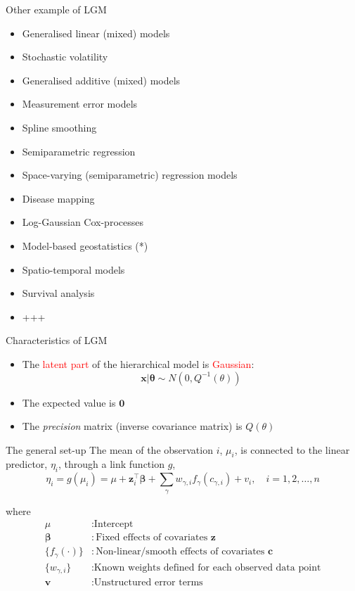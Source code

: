 \documentclass[
  ignorenonframetext,
]{beamer}
\providecommand{\tightlist}{%
  \setlength{\itemsep}{0pt}\setlength{\parskip}{0pt}}
\begin{document}
\begin{frame}{Other example of LGM}
\protect\hypertarget{other-example-of-lgm}{}
\begin{itemize}
\tightlist
\item
  Generalised linear (mixed) models
\item
  Stochastic volatility
\item
  Generalised additive (mixed) models
\item
  Measurement error models
\item
  Spline smoothing
\item
  Semiparametric regression
\item
  Space-varying (semiparametric) regression models
\item
  Disease mapping
\item
  Log-Gaussian Cox-processes
\item
  Model-based geostatistics (*)
\item
  Spatio-temporal models
\item
  Survival analysis
\item
  +++
\end{itemize}
\end{frame}

\begin{frame}{Characteristics of LGM}
\protect\hypertarget{characteristics-of-lgm}{}
\begin{itemize}
\item
  The \textcolor{red}{latent part} of the hierarchical model is
  \textcolor{red}{Gaussian}: \[
  \boldsymbol{x} | \boldsymbol{\theta} \sim N(0, {Q}^{-1}(\theta))
  \]
\item
  The expected value is \(\boldsymbol{0}\)
\item
  The \emph{precision} matrix (inverse covariance matrix) is
  \({Q}(\theta)\)
\end{itemize}
\end{frame}

\begin{frame}{The general set-up}
\protect\hypertarget{the-general-set-up}{}
The mean of the observation \(i\), \(\mu_i\), is connected to the linear
predictor, \(\eta_i\), through a link function \(g\), \[
\eta_i = g(\mu_i) = \mu + \boldsymbol{z}_i^\top \boldsymbol{\beta}+\sum_{\gamma} w_{\gamma, i} f_\gamma(c_{\gamma,i})+v_i, \quad i = 1,2,\ldots,n
\]

where \[
\begin{aligned}
\mu &: \text{Intercept}\\
        \boldsymbol{\beta} &: \text{Fixed effects of covariates \(\boldsymbol{z}\)}\\
        \{f_\gamma(\cdot)\} &: \text{Non-linear/smooth effects of covariates \(\boldsymbol{c}\)}\\
        \{w_{\gamma,i}\} &: \text{Known weights defined for each observed data point}\\
        \boldsymbol{v} &: \text{Unstructured error terms}
\end{aligned}
\]
\end{frame}
\end{document}
